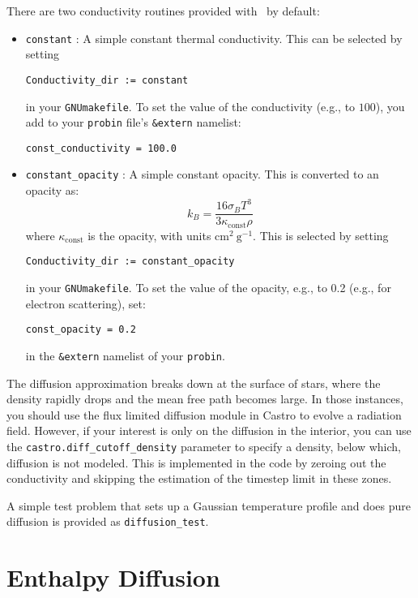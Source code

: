 There are two conductivity routines provided with \castro\ by default:
\begin{itemize}
\item {\tt constant} : A simple constant thermal conductivity.  This can be 
  selected by setting 
\begin{verbatim}
Conductivity_dir := constant
\end{verbatim}
in your {\tt GNUmakefile}.  To set the value of the conductivity (e.g., to
$100$), you add to your {\tt probin} file's {\tt \&extern} namelist:
\begin{verbatim}
const_conductivity = 100.0
\end{verbatim}

\item {\tt constant\_opacity} : A simple constant opacity.  This is
  converted to an opacity as:
  \begin{equation}
    k_B = \frac{16 \sigma_B T^3}{3 \kappa_\mathrm{const} \rho}
  \end{equation}
where $\kappa_\mathrm{const}$ is the opacity, with units $\mathrm{cm^2~g^{-1}}$.
This is selected by setting
\begin{verbatim}
Conductivity_dir := constant_opacity
\end{verbatim}
in your {\tt GNUmakefile}.  To set the value of the opacity, e.g., to
0.2 (e.g., for electron scattering), set:
\begin{verbatim}
const_opacity = 0.2
\end{verbatim}
in the {\tt \&extern} namelist of your {\tt probin}.

\end{itemize}

The diffusion approximation breaks down at the surface of stars,
where the density rapidly drops and the mean free path becomes 
large.  In those instances, you should use the flux limited diffusion
module in Castro to evolve a radiation field.  However, if your
interest is only on the diffusion in the interior, you can use
the {\tt castro.diff\_cutoff\_density} parameter to specify a density,
below which, diffusion is not modeled.  This is implemented in the
code by zeroing out the conductivity and skipping the estimation
of the timestep limit in these zones.

A simple test problem that sets up a Gaussian temperature profile 
and does pure diffusion is provided as {\tt diffusion\_test}.



\section{Enthalpy Diffusion}

